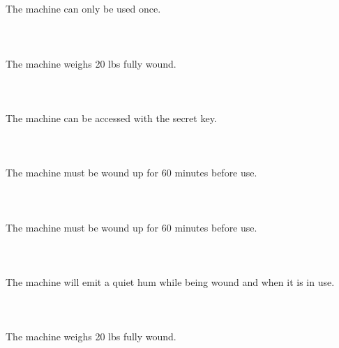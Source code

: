 \documentclass{article}
\begin{document}
    \section{}
    The machine can only be used once.\\\\ 
    \newpage
    
    \section{}
    The machine weighs 20 lbs fully wound.\\\\ 
    \newpage
    
    \section{}
    The machine can be accessed with the secret key.\\\\ 
    \newpage
    
    \section{}
    The machine must be wound up for 60 minutes before use.\\\\ 
    \newpage
    
    \section{}
    The machine must be wound up for 60 minutes before use.\\\\ 
    \newpage
    
    \section{}
    The machine will emit a quiet hum while being wound and when it is in use.\\\\ 
    \newpage
    
    \section{}
    The machine weighs 20 lbs fully wound.\\\\ 
    \newpage
    
\end{document}
